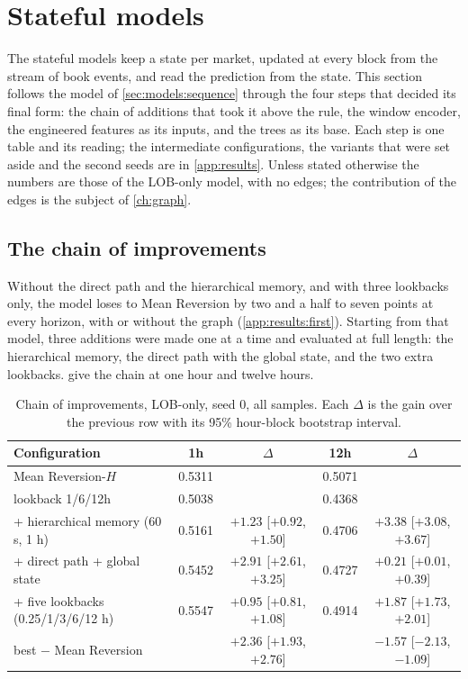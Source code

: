 \section{Stateful models}
\label{ch:stateful}

The stateful models keep a state per market, updated at every block from the stream of
book events, and read the prediction from the state.  This section follows the model of
\cref{sec:models:sequence} through the four steps that decided its final form: the chain of
additions that took it above the rule, the window encoder, the engineered features as its
inputs, and the trees as its base.  Each step is one table and its reading; the
intermediate configurations, the variants that were set aside and the second seeds are in
\cref{app:results}.  Unless stated otherwise the numbers are those of the LOB-only model,
with no edges; the contribution of the edges is the subject of \cref{ch:graph}.

\subsection{The chain of improvements}
\label{sec:stateful:chain}
\label{sec:stateful:first}

Without the direct path and the hierarchical memory, and with three lookbacks only, the
model loses to Mean Reversion by two and a half to seven points at every horizon, with or without the
graph (\cref{app:results:first}).  Starting from that model, three additions were made one at a
time and evaluated at full length: the hierarchical memory, the direct path with the global
state, and the two extra lookbacks.   give the chain
at one hour and twelve hours.

\begin{table}[t]
\centering
\caption{Chain of improvements, LOB-only, seed 0, all samples.  Each $\Delta$ is the gain over the previous row with its 95\% hour-block bootstrap interval.}
\label{tab:exp:chain}
\begin{fittable}\begin{tabular}{lcccc}
\toprule
Configuration & 1h & $\Delta$ & 12h & $\Delta$ \\
\midrule
Mean Reversion-$H$                 & 0.5311 & & 0.5071 & \\
\midrule
lookback 1/6/12h                   & 0.5038 & & 0.4368 & \\
+ hierarchical memory (60 s, 1 h)  & 0.5161 & $+1.23$ [$+0.92$, $+1.50$] & 0.4706 & $+3.38$ [$+3.08$, $+3.67$] \\
+ direct path + global state       & 0.5452 & $+2.91$ [$+2.61$, $+3.25$] & 0.4727 & $+0.21$ [$+0.01$, $+0.39$] \\
+ five lookbacks (0.25/1/3/6/12 h) & 0.5547 & $+0.95$ [$+0.81$, $+1.08$] & 0.4914 & $+1.87$ [$+1.73$, $+2.01$] \\
\midrule
best $-$ Mean Reversion            & & $+2.36$ [$+1.93$, $+2.76$] & & $-1.57$ [$-2.13$, $-1.09$] \\
\bottomrule
\end{tabular}\end{fittable}
\end{table}

